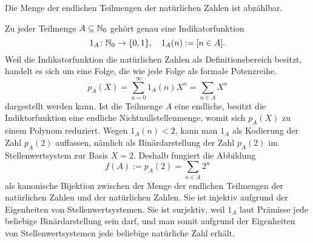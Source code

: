 \begin{Satz}
Die Menge der endlichen Teilmengen der natürlichen Zahlen ist
abzählbar.
\end{Satz}

\begin{Beweis}
Zu jeder Teilmenge $A\subseteq\mathbb N_0$ gehört genau eine Indikatorfunktion
\[1_A\colon\mathbb N_0\to\{0,1\},\quad 1_A(n) := [n\in A].\]
Weil die Indikatorfunktion die natürlichen Zahlen als Definitionsbereich
besitzt, handelt es sich um eine Folge, die wie jede Folge als formale Potenzreihe.
\[p_A(X) = \sum_{n=0}^\infty 1_A(n)X^n = \sum_{n\in A} X^n\]
dargestellt werden kann. Ist die Teilmenge $A$ eine endliche, besitzt
die Indiktorfunktion eine endliche Nichtnullstellenmenge, womit sich
$p_A(X)$ zu einem Polynom reduziert. Wegen $1_A(n)<2$, kann man
$1_A$ als Kodierung der Zahl $p_A(2)$ auffassen, nämlich als Binärdarstellung
der Zahl $p_A(2)$ im Stellenwertsystem zur Basis $X=2$. Deshalb fungiert
die Abbildung
\[f(A) := p_A(2) = \sum_{n\in A} 2^n\]
als kanonische Bijektion zwischen der Menge der endlichen Teilmengen der
natürlichen Zahlen und der natürlichen Zahlen. Sie ist injektiv
aufgrund der Eigenheiten von Stellenwertsystemen. Sie ist surjektiv,
weil $1_A$ laut Prämisse jede beliebige Binärdarstellung sein darf,
und man somit aufgrund der Eigenheiten von Stellenwertsystemen jede
beliebige natürliche Zahl erhält.\,\qedsymbol
\end{Beweis}
